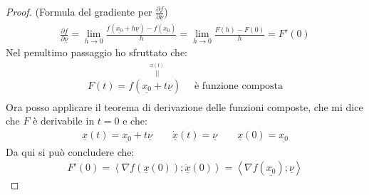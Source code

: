 \documentclass[a4paper, oneside]{article}
\begin{document}
        \begin{proof}
            (Formula del gradiente per $\frac{\partial f}{\partial \underline{\nu}}$)\\
            \begin{gather*}
                \frac{\partial f}{\partial \underline{\nu}} = \lim_{h \to 0} \frac{f(\underline{x_0}+h \underline{\nu})-f(\underline{x_0})}{h} = \lim_{h \to 0}\frac{F(h)-F(0)}{h} = F'(0)
            \end{gather*}
            Nel penultimo passaggio ho sfruttato che:
            \begin{gather*}
                F(t) = f\overset{\overset{\underline{x}(t)}{||}}{(\underline{x_0}+t \underline{\nu})} \quad \text{ è funzione composta}\\
            \end{gather*}
            Ora posso applicare il teorema di derivazione delle funzioni composte, che mi dice che $F$ è derivabile in $t=0$ e che:
            \begin{gather*}
                \underline{x}(t) = \underline{x_0} + t \underline{\nu} \qquad \underline{\dot{x}}(t) = \underline{\nu} \qquad \underline{x}(0) = \underline{x_0}  
            \end{gather*}
            Da qui si può concludere che:
            \begin{gather*}
                F'(0) = \left\langle \nabla f(\underline{x}(0)); \underline{\dot{x}}(0) \right\rangle = \left\langle \nabla f(\underline{x_0});\underline{\nu} \right\rangle
            \end{gather*}
        \end{proof}
\end{document}
